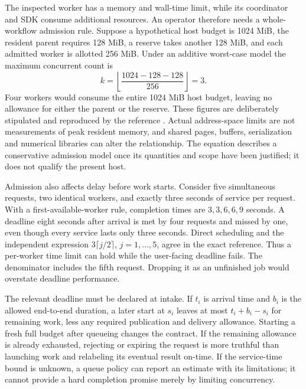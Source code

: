 The inspected worker has a memory and wall-time limit, while its coordinator
and SDK consume additional resources. An operator therefore needs a
whole-workflow admission rule. Suppose a hypothetical host budget is
1024 MiB, the resident parent requires 128 MiB, a reserve takes another
128 MiB, and each admitted worker is allotted 256 MiB. Under an additive
worst-case model the maximum concurrent count is
\begin{equation}
 k=\left\lfloor\frac{1024-128-128}{256}\right\rfloor=3.
 \label{exec17:i4-memory}
\end{equation}
Four workers would consume the entire 1024 MiB host budget, leaving no allowance for either the parent or the reserve. These
figures are deliberately stipulated and reproduced by the reference
\citep{exec17_integration_review_reference}. Actual address-space limits are
not measurements of peak resident memory, and shared pages, buffers,
serialization and numerical libraries can alter the relationship. The
equation describes a conservative admission model once its quantities and
scope have been justified; it does not qualify the present host.

Admission also affects delay before work starts. Consider five simultaneous
requests, two identical workers, and exactly three seconds of service per
request. With a first-available-worker rule, completion times are
$3,3,6,6,9$ seconds. A deadline eight seconds after arrival is met by four
requests and missed by one, even though every service lasts only three
seconds. Direct scheduling and the independent expression
$3\lceil j/2\rceil$, $j=1,\ldots,5$, agree in the exact reference.
Thus a per-worker time limit can hold while the user-facing deadline fails.
The denominator includes the fifth request. Dropping it as an unfinished
job would overstate deadline performance.

The relevant deadline must be declared at intake. If $t_i$ is arrival time
and $b_i$ is the allowed end-to-end duration, a later start at $s_i$ leaves
at most $t_i+b_i-s_i$ for remaining work, less any required publication and
delivery allowance. Starting a fresh full budget after queueing changes the
contract. If the remaining allowance is already exhausted, rejecting or
expiring the request is more truthful than launching work and relabeling
its eventual result on-time. If the service-time bound is unknown, a queue
policy can report an estimate with its limitations; it cannot provide a
hard completion promise merely by limiting concurrency.

